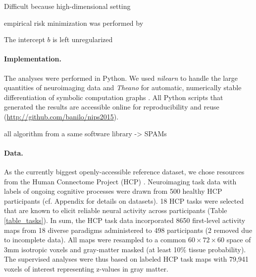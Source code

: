 \documentclass{article} %
\begin{document}
Difficult because high-dimensional setting

empirical risk minimization was performed by


The intercept $b$ is left unregularized





\paragraph{Implementation.}
The analyses were performed in Python.
We used \textit{nilearn} to handle
the large quantities of neuroimaging data 
\cite{abrah14}
and
\textit{Theano} for automatic, numerically stable
differentiation of symbolic computation graphs
\cite{bastien2012theano, bergstra2010theano}.
All Python scripts that generated the results are
accessible online for reproducibility and reuse
(\url{http://github.com/banilo/nips2015}).
  

all algorithm from a same software library -> SPAMs

%
\paragraph{Data.}
As the currently biggest openly-accessible reference dataset,
we chose resources from the Human Connectome Project (HCP)
\cite{barch2013}.
Neuroimaging task data with labels of ongoing cognitive processes
were drawn from 500
healthy HCP participants (cf. Appendix for details on datasets).
18 HCP tasks 
were selected that are known to elicit reliable neural activity
across participants (Table \ref{table_tasks}).
In sum, the HCP task data incorporated 8650 first-level activity maps
from 18 diverse paradigms administered to 498 participants (2 removed
due to incomplete data).
All maps were resampled to a common $60\times72\times60$ space of
3mm isotropic voxels and gray-matter masked (at least 10\% tissue
probability).
The supervised analyses were thus based on labeled HCP task maps with
79,941 voxels of interest representing z-values in gray matter.
\end{document}
